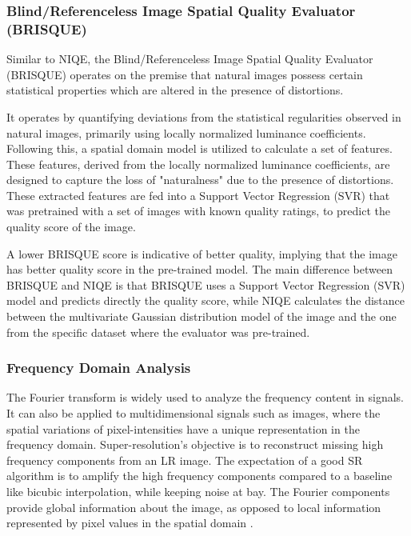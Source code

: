         \subsubsection{Blind/Referenceless Image Spatial Quality Evaluator (BRISQUE)}

            Similar to NIQE, the Blind/Referenceless Image Spatial Quality Evaluator (BRISQUE) \cite{mittal2012} operates on the premise that natural images possess certain statistical properties which are altered in the presence of distortions. 
            
            It operates by quantifying deviations from the statistical regularities observed in natural images, primarily using locally normalized luminance coefficients. 
            Following this, a spatial domain model is utilized to calculate a set of features. 
            These features, derived from the locally normalized luminance coefficients, are designed to capture the loss of "naturalness" due to the presence of distortions.
            These extracted features are fed into a Support Vector Regression (SVR) that was pretrained with a set of images with known quality ratings, to predict the quality score of the image.
            
            A lower BRISQUE score is indicative of better quality, implying that the image has better quality score in the pre-trained model. The main difference between BRISQUE and NIQE is that BRISQUE uses a Support Vector Regression (SVR) model and predicts directly the quality score, while NIQE calculates the distance between the multivariate Gaussian distribution model of the image and the one from the specific dataset where the evaluator was pre-trained.




        \subsubsection{Frequency Domain Analysis} \label{subsubsec:frequency_domain_analysis}
        
        The Fourier transform is widely used to analyze the frequency content in signals.
        It can also be applied to multidimensional signals such as images, where the spatial variations of pixel-intensities have a unique representation in the frequency domain. 
        Super-resolution's objective is to reconstruct missing high frequency components from an LR image.
        The expectation of a good SR algorithm is to amplify the high frequency components compared to a baseline like bicubic interpolation, while keeping noise at bay.
        The Fourier components provide global information about the image, as opposed to local information represented by pixel values in the spatial domain \cite{fuoli2021fourier}. 
        
